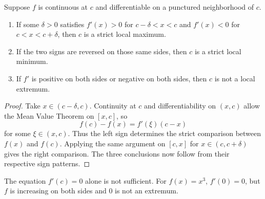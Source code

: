 \begin{theorem}
\label{thm:first-derivative-test}
Suppose $f$ is continuous at $c$ and differentiable on a punctured
neighborhood of $c$.
\begin{enumerate}
\item If some $\delta>0$ satisfies $f'(x)>0$ for
$c-\delta<x<c$ and $f'(x)<0$ for $c<x<c+\delta$, then $c$ is a strict
local maximum.
\item If the two signs are reversed on those same sides, then $c$ is a
strict local minimum.
\item If $f'$ is positive on both sides or negative on both sides, then
$c$ is not a local extremum.
\end{enumerate}
\end{theorem}
\begin{proof}
Take $x\in(c-\delta,c)$. Continuity at $c$ and differentiability on
$(x,c)$ allow the Mean Value Theorem on $[x,c]$, so
\[
f(c)-f(x)=f'(\xi)(c-x)
\]
for some $\xi\in(x,c)$. Thus the left sign determines the strict comparison
between $f(x)$ and $f(c)$. Applying the same argument on $[c,x]$ for
$x\in(c,c+\delta)$ gives the right comparison. The three conclusions now
follow from their respective sign patterns.
\end{proof}
The equation \(f'(c)=0\) alone is not sufficient. For \(f(x)=x^3\),
\(f'(0)=0\), but \(f\) is increasing on both sides and \(0\) is not an
extremum.

